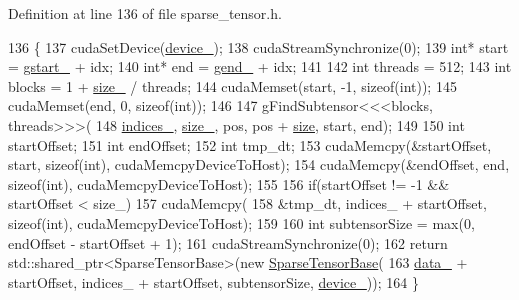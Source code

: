 Definition at line 136 of file sparse\+\_\+tensor.\+h.


\begin{DoxyCode}
136                                                                         \{
137     cudaSetDevice(\hyperlink{classmarian_1_1SparseTensorBase_a56fcd8295b57ec3eb731cd431f80c110}{device\_});
138     cudaStreamSynchronize(0);
139     \textcolor{keywordtype}{int}* start = \hyperlink{classmarian_1_1SparseTensorBase_ab8941274a48c9bf0f53785888e97e9d9}{gstart\_} + idx;
140     \textcolor{keywordtype}{int}* end = \hyperlink{classmarian_1_1SparseTensorBase_a226a045c5a1148e945a177bd283c693b}{gend\_} + idx;
141 
142     \textcolor{keywordtype}{int} threads = 512;
143     \textcolor{keywordtype}{int} blocks = 1 + \hyperlink{classmarian_1_1SparseTensorBase_a688fe45dc53bafb2eaded0ea9303867c}{size\_} / threads;
144     cudaMemset(start, -1, \textcolor{keyword}{sizeof}(\textcolor{keywordtype}{int}));
145     cudaMemset(end, 0, \textcolor{keyword}{sizeof}(\textcolor{keywordtype}{int}));
146 
147     gFindSubtensor<<<blocks, threads>>>(
148         \hyperlink{classmarian_1_1SparseTensorBase_a365dfd224d685b1cc9c8006d5f608cbf}{indices\_}, \hyperlink{classmarian_1_1SparseTensorBase_a688fe45dc53bafb2eaded0ea9303867c}{size\_}, pos, pos + \hyperlink{classmarian_1_1SparseTensorBase_af8c34e3fb5b12c7a65dbe6892c5ca0d1}{size}, start, end);
149 
150     \textcolor{keywordtype}{int} startOffset;
151     \textcolor{keywordtype}{int} endOffset;
152     \textcolor{keywordtype}{int} tmp\_dt;
153     cudaMemcpy(&startOffset, start, \textcolor{keyword}{sizeof}(\textcolor{keywordtype}{int}), cudaMemcpyDeviceToHost);
154     cudaMemcpy(&endOffset, end, \textcolor{keyword}{sizeof}(\textcolor{keywordtype}{int}), cudaMemcpyDeviceToHost);
155 
156     \textcolor{keywordflow}{if}(startOffset != -1 && startOffset < size\_)
157       cudaMemcpy(
158           &tmp\_dt, indices\_ + startOffset, \textcolor{keyword}{sizeof}(\textcolor{keywordtype}{int}), cudaMemcpyDeviceToHost);
159 
160     \textcolor{keywordtype}{int} subtensorSize = max(0, endOffset - startOffset + 1);
161     cudaStreamSynchronize(0);
162     \textcolor{keywordflow}{return} std::shared\_ptr<SparseTensorBase>(\textcolor{keyword}{new} \hyperlink{classmarian_1_1SparseTensorBase_a14749b9a7f78366bfe1cc9695c132128}{SparseTensorBase}(
163         \hyperlink{classmarian_1_1SparseTensorBase_a633f417eb28496e8c0268e551e1992cf}{data\_} + startOffset, indices\_ + startOffset, subtensorSize, \hyperlink{classmarian_1_1SparseTensorBase_a56fcd8295b57ec3eb731cd431f80c110}{device\_}));
164   \}
\end{DoxyCode}


